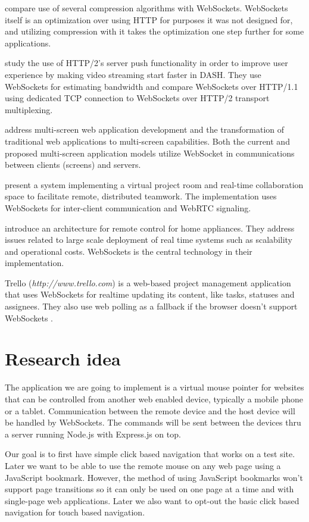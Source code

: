 \documentclass[12pt,a4paper,english,oneside]{article}
\begin{document}
\citet{compression} compare use of several compression algorithms with
WebSockets. WebSockets itself is an optimization over using HTTP for
purposes it was not designed for, and utilizing compression with it
takes the optimization one step further for some applications.

\citet{http2} study the use of HTTP/2's server push functionality in
order to improve user experience by making video streaming start
faster in DASH. They use WebSockets for estimating bandwidth and
compare WebSockets over HTTP/1.1 using dedicated TCP connection to
WebSockets over HTTP/2 transport multiplexing.

\citet{bassbouss} address multi-screen web application development and
the transformation of traditional web applications to multi-screen
capabilities. Both the current and proposed multi-screen application
models utilize WebSocket in communications between clients (screens)
and servers.

\citet{projectrooms} present a system implementing a virtual project
room and real-time collaboration space to facilitate remote,
distributed teamwork. The implementation uses WebSockets for
inter-client communication and WebRTC signaling.

\citet{homeappliances} introduce an architecture for remote control for
home appliances. They address issues related to large scale deployment
of real time systems such as scalability and operational
costs. WebSockets is the central technology in their implementation.

Trello (\emph{http://www.trello.com}) is a web-based project
management application that uses WebSockets for realtime updating its
content, like tasks, statuses and assignees. They also use web polling
as a fallback if the browser doesn't support WebSockets
\citep{trello}.

\section{Research idea}

The application we are going to implement is a virtual mouse pointer
for websites that can be controlled from another web enabled device,
typically a mobile phone or a tablet. Communication between the remote
device and the host device will be handled by WebSockets. The commands
will be sent between the devices thru a server running Node.js with
Express.js on top.

Our goal is to first have simple click based navigation that works on
a test site. Later we want to be able to use the remote mouse on any
web page using a JavaScript bookmark. However, the method of using
JavaScript bookmarks won't support page transitions so it can only be
used on one page at a time and with single-page web applications. Later
we also want to opt-out the basic click based navigation for touch
based navigation.
\end{document}
